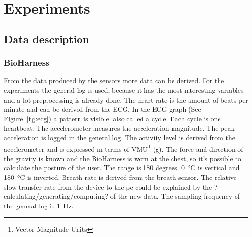 \section{Experiments}
	\subsection{Data description}
	\label{sec:datadescription}
		\subsubsection{BioHarness}
		From the data produced by the sensors more data can be derived. For the experiments the general log is used, because it has the most interesting variables and a lot preprocessing is already done. The heart rate is the amount of beats per minute and can be derived from the ECG. In the ECG graph (See Figure~\ref{fig:ecg}) a pattern is visible, also called a cycle. Each cycle is one heartbeat. 
			The accelerometer measures the acceleration magnitude. The peak acceleration is logged in the general log.
			The activity level is derived from the accelerometer and is expressed in terms of VMU\footnote{Vector Magnitude Units} (g).
			The force and direction of the gravity is known and the BioHarness is worn at the chest, so it's possible to calculate the posture of the user. The range is 180 degrees. \SI{0}{\celsius} is vertical and \SI{180}{\celsius} is inverted.
			Breath rate is derived from the breath sensor. The relative slow transfer rate from the device to the pc could be explained by the ?calculating/generating/computing? of the new data. The sampling frequency of the general log is \SI{1}{\hertz}.
